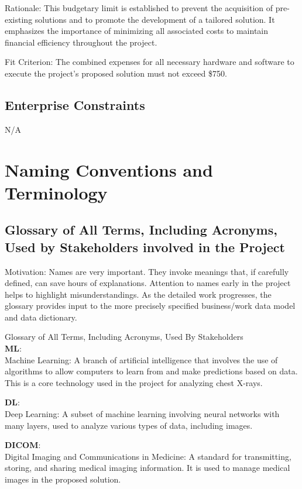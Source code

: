 \documentclass[12pt]{article}
\begin{document}
Rationale: This budgetary limit is established to prevent the acquisition of pre-existing 
solutions and to promote the development of a tailored solution. It emphasizes the importance of 
minimizing all associated costs to maintain financial efficiency throughout the project.

Fit Criterion: The combined expenses for all necessary hardware and software to execute the 
project’s proposed solution must not exceed \$750.

\subsection{Enterprise Constraints}
N/A

\section{Naming Conventions and Terminology}
\subsection{Glossary of All Terms, Including Acronyms, Used by Stakeholders
involved in the Project}
Motivation: Names are very important. They invoke meanings that, if carefully defined, can save 
hours of explanations. Attention to names early in the project helps to highlight 
misunderstandings. As the detailed work progresses, the glossary provides input to the more 
precisely specified business/work data model and data dictionary.

Glossary of All Terms, Including Acronyms, Used By Stakeholders\\

\textbf{ML}:\\
Machine Learning: A branch of artificial intelligence that involves the use of algorithms to allow 
computers to learn from and make predictions based on data. This is a core technology used in the 
project for analyzing chest X-rays.

\textbf{DL}:\\
Deep Learning: A subset of machine learning involving neural networks with many layers, used to 
analyze various types of data, including images.

\textbf{DICOM}:\\
Digital Imaging and Communications in Medicine: A standard for transmitting, storing, and sharing 
medical imaging information. It is used to manage medical images in the proposed solution.
\end{document}
